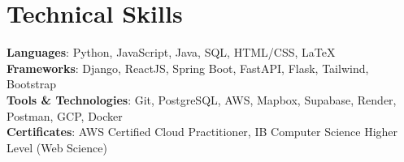 \documentclass[letterpaper,11pt]{article}
\begin{document}
%
\section{Technical Skills}
 \begin{itemize}[leftmargin=0.15in, label={}]
    \small{\item{
     \textbf{Languages}{: Python, JavaScript, Java, SQL, HTML/CSS, LaTeX} \\
     \textbf{Frameworks}{: Django, ReactJS, Spring Boot, FastAPI, Flask, Tailwind, Bootstrap} \\
     \textbf{Tools \& Technologies}{: Git, PostgreSQL, AWS, Mapbox, Supabase, Render, Postman, GCP, Docker} \\
     \textbf{Certificates}{: AWS Certified Cloud Practitioner, IB Computer Science Higher Level (Web Science)}
    }}
 \end{itemize}


\end{document}
